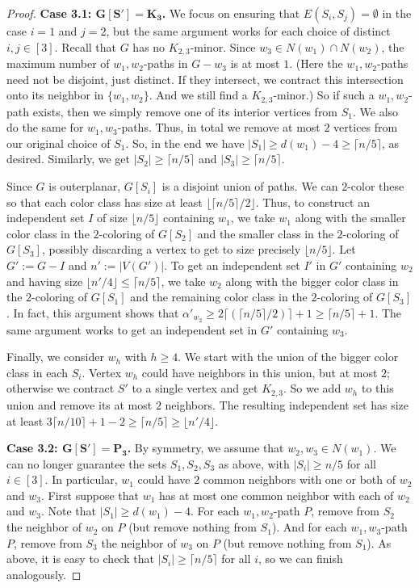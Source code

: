 \documentclass[10pt,a4paper]{amsart}
\newcommand\ceil[1]{\lceil#1\rceil}
\newcommand\floor[1]{\lfloor#1\rfloor}
\renewcommand\ge\geqslant
\renewcommand\le\leqslant
\begin{document}
\begin{proof}
\textbf{Case 3.1: $\bm{G[S']=K_3}$.}
We focus on ensuring that $E(S_i,S_j)=\emptyset$ in the case $i=1$ and $j=2$, but the same argument works for each choice of distinct $i,j\in[3]$.
Recall that $G$ has no $K_{2,3}$-minor.  Since $w_3\in N(w_1)\cap N(w_2)$, the maximum number of $w_1,w_2$-paths in $G-w_3$ is at most $1$.
(Here the $w_1,w_2$-paths need not be disjoint, just distinct.  If they intersect, we contract this intersection onto its neighbor in 
$\{w_1,w_2\}$.  And we still find a $K_{2,3}$-minor.)  So if such a $w_1,w_2$-path exists, then we simply remove one of its interior
vertices from $S_1$.  We also do the same for $w_1,w_3$-paths.  Thus, in total we remove at most $2$ vertices from our original choice of $S_1$.
So, in the end we have $|S_1|\ge d(w_1)-4 \ge \lceil n/5\rceil$, as desired.  Similarly, we get $|S_2|\ge \lceil n/5\rceil$ and 
$|S_3|\ge \lceil n/5\rceil$.

Since $G$ is outerplanar, $G[S_i]$ is a disjoint union of paths.  We can $2$-color these so that each color class has size at least 
$\lfloor \lceil n/5\rceil/2\rfloor$.  Thus, to construct an independent set $I$ of size $\lfloor n/5\rfloor$ containing $w_1$, we take $w_1$
along with the smaller color class in the $2$-coloring of $G[S_2]$ and the smaller class in the $2$-coloring of $G[S_3]$, 
possibly discarding a vertex to get to size precisely $\lfloor n/5\rfloor$.  Let $G':=G-I$ and $n':=|V(G')|$.  To get an independent set $I'$
in $G'$ containing $w_2$ and having size $\lfloor n'/4\rfloor\le \lceil n/5\rceil$, we take $w_2$ along with the bigger color class in the 
$2$-coloring of $G[S_1]$ and the remaining color class in the $2$-coloring of $G[S_3]$.  
In fact, this argument shows that $\alpha'_{w_2} \ge 2\lceil(\lceil n/5\rceil/2)\rceil + 1 \ge \lceil n/5\rceil+1$.
The same argument works to get an independent set in $G'$ containing $w_3$.

Finally, we consider $w_h$ with $h\ge 4$.  We start with the union of the bigger color class in each $S_i$.  Vertex $w_h$ could have neighbors in
this union, but at most $2$; otherwise we contract $S'$ to a single vertex and get $K_{2,3}$.  So we add $w_h$ to this union and remove its at 
most $2$ neighbors.  The resulting independent set has size at least $3\ceil{n/10}+1-2 \ge \ceil{n/5} \ge \floor{n'/4}$.

\textbf{Case 3.2: $\bm{G[S']=P_3}$.}
By symmetry, we assume that $w_2,w_3\in N(w_1)$.
We can no longer guarantee the sets $S_1,S_2,S_3$ as above, with $|S_i|\ge n/5$ for all $i\in [3]$.
In particular, $w_1$ could have $2$ common neighbors with one or both of $w_2$ and $w_3$.
First suppose that $w_1$ has at most one common neighbor with each of $w_2$ and $w_3$.  Note that $|S_1|\ge d(w_1)-4$.  
For each $w_1,w_2$-path $P$, remove from $S_2$ the neighbor of $w_2$ on $P$ (but remove nothing from $S_1$).
And for each $w_1,w_3$-path $P$, remove from $S_3$ the neighbor of $w_3$ on $P$ (but remove nothing from $S_1$).
As above, it is easy to check that $|S_i|\ge \ceil{n/5}$ for all $i$, so we can finish analogously.


\end{proof}
\end{document}
